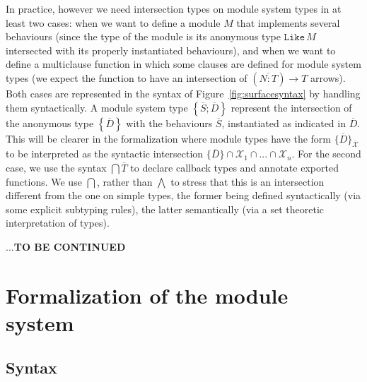 \documentclass[a4paper,10pt]{article}
\newcommand{\BX}{\ensuremath{\mathcal{X}}}
\begin{document}
  In practice, however we need intersection types on module system types in at least two cases: when we want to define a module $M$ that implements several behaviours (since the type of the module is its anonymous type $\texttt{Like}\,M$ intersected with its properly instantiated behaviours), and when we want to define a multiclause function in which some clauses are defined for module system types (we expect the function to have an intersection of $(\overline{N:T})\to T$ arrows). Both cases are represented in the syntax of Figure~\ref{fig:surfacesyntax} by handling them syntactically. A module system type $\left\{\overline{S};\overline{D}\right\}$ represent the intersection of the anonymous type $\left\{\overline{D}\right\}$ with the behaviours $\overline{S}$, instantiated as indicated in $\overline{D}$. This will be clearer in the formalization where module types have the form $\{\overline{D}\}_{\overline{\BX}}$ to be interpreted as the syntactic intersection $\{\overline D\}\cap{\BX_1}\cap...\cap{\BX_n}$. For the second case, we use the syntax $\bigcap \overline{T}$ to declare callback types and annotate exported functions. We use $\bigcap$, rather than $\bigwedge$ to stress that this is an intersection different from the one on simple types, the former being defined syntactically (via some explicit subtyping rules), the latter semantically (via a set theoretic interpretation of types).

  ...\textbf{TO BE CONTINUED}




\section{Formalization of the module system}

\subsection{Syntax}
\end{document}
